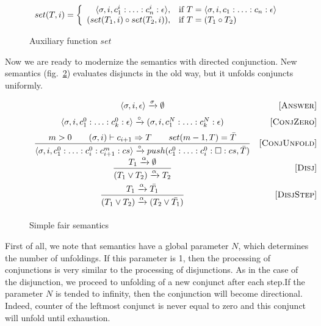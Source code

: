 \begin{figure}[h!]
\[
set(T, i) =
\left\{
\begin{array}{rl}
\langle \sigma, i, c_1^i : \ldots : c_n^i : \epsilon \rangle, & \mbox{if } T = \langle \sigma, i, c_1 : \ldots : c_n : \epsilon \rangle \\
(set(T_1, i) \circ set(T_2, i)), & \mbox{if } T = (T_1 \circ T_2)
\end{array}
\right.
\]
\caption{Auxiliary function $set$}
\label{fair:set-semantics}
\end{figure}

Now we are ready to modernize the semantics with directed conjunction. New semantics (fig.~\ref{fair:naive-semantics}) evaluates disjuncts in the old way, but it unfolds conjuncts uniformly.

\begin{figure}[h!]
\[\begin{array}{cr}

      {\langle \sigma, i, \epsilon \rangle \xrightarrow{\sigma} \emptyset}  
&     \mbox{[\textsc{Answer}]} \\[2mm]
      {\langle \sigma, i, c_1^0 : \ldots : c_k^0 : \epsilon \rangle \xrightarrow{\circ} (\sigma, i, c_1^N : \ldots : c_k^N : \epsilon)}
&     \mbox{[\textsc{ConjZero}]} \\[2mm]
\dfrac{m > 0 \qquad (\sigma, i) \vdash c_{i+1} \Rightarrow T \qquad set(m - 1, T) = \bar{T}}
      {\langle \sigma, i, c_1^0 : \ldots : c_i^0 : c_{i+1}^m : cs \rangle \xrightarrow{\circ} push(c_1^0 : \ldots : c_i^0 : \Box : cs, \bar{T})}
&     \mbox{[\textsc{ConjUnfold}]} \\[2mm]
\dfrac{T_1 \xrightarrow{\alpha} \emptyset}
      {(T_1 \lor T_2) \xrightarrow{\alpha} T_2}
&     \mbox{[\textsc{Disj}]} \\[4mm]
\dfrac{T_1 \xrightarrow{\alpha} \bar{T_1}}
      {(T_1 \lor T_2) \xrightarrow{\alpha} (T_2 \lor\bar{T_1})}
&     \mbox{[\textsc{DisjStep}]} \\[4mm]
\end{array}\]
\caption{Simple fair semantics}
\label{fair:naive-semantics}
\end{figure}

First of all, we note that semantics have a global parameter $N$, which determines the number of unfoldings. 
If this parameter is 1, then the processing of conjunctions is very similar to the processing of disjunctions. 
As in the case of the disjunction, we proceed to unfolding of a new conjunct after each step.If the parameter $N$ is tended to infinity, then the conjunction will become directional. Indeed, counter of the leftmost conjunct is never equal to zero and this conjunct will unfold until exhaustion.


